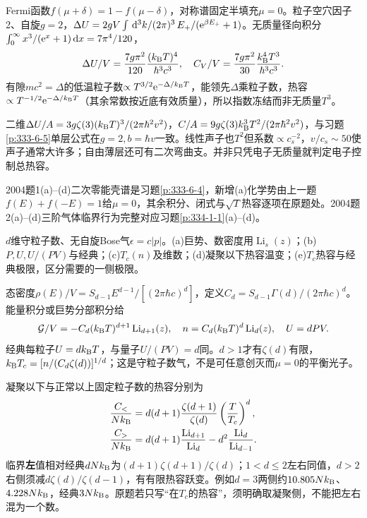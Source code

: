 \begin{solution}
Fermi函数$f(\mu+\delta)=1-f(\mu-\delta)$，对称谱固定半填充$\mu=0$。粒子空穴因子2、自旋$g=2$，$\Delta U=2gV\int\,\mathrm d^3k/(2\pi)^3\,E_+/(\mathrm e^{\beta E_+}+1)$。无质量径向积分$\int_0^\infty x^3/(\mathrm e^x+1)\,\mathrm d x=7\pi^4/120$，
\begin{equation}
\Delta U/V=\frac{7g\pi^2}{120}\frac{(k_{\mathrm B} T)^4}{\hbar^3c^3},\quad C_V/V=\frac{7g\pi^2}{30}\frac{k_{\mathrm B}^4T^3}{\hbar^3c^3}.
\end{equation}
有隙$m c^2=\Delta$的低温粒子数$\propto T^{3/2}\mathrm e^{-\Delta/k_{\mathrm B} T}$，能领先$\Delta$乘粒子数，热容$\propto T^{-1/2}\mathrm e^{-\Delta/k_{\mathrm B} T}$（其余常数按近底有效质量），所以指数冻结而非无质量$T^3$。

二维$\Delta U/A=3g\zeta(3)(k_{\mathrm B} T)^3/(2\pi\hbar^2v^2)$，$C/A=9g\zeta(3)k_{\mathrm B}^3T^2/(2\pi\hbar^2v^2)$，与习题\ref{p:333-6-5}单层公式在$g=2,b=\hbar v$一致。线性声子也$T^2$但系数$\propto c_s^{-2}$，$v/c_s\sim50$使声子通常大许多；自由薄层还可有二次弯曲支。并非只凭电子无质量就判定电子控制总热容。
\end{solution}
2004题1(a)--(d)二次零能壳谱是习题\ref{p:333-6-4}，新增(a)化学势由上一题$f(E)+f(-E)=1$给$\mu=0$，其余积分、闭式与$\sqrt T$热容逐项在原题处。2004题2(a)--(d)三阶气体临界行为完整对应习题\ref{p:334-1-1}(a)--(d)。
\begin{exercise}[2004题3(a)--(e)]\label{f:333-2004-3}
$d$维守粒子数、无自旋Bose气$\epsilon=c|p|$。(a)巨势、数密度用$\operatorname{Li}_s(z)$；(b)$P,U,U/(PV)$与经典；(c)$T_c(n)$及维数；(d)凝聚以下热容温变；(e)$T_c$热容与经典极限，区分需要的一侧极限。
\end{exercise}
\begin{solution}
态密度$\rho(E)/V=S_{d-1}E^{d-1}/[(2\pi\hbar c)^d]$，定义$C_d=S_{d-1}\Gamma(d)/(2\pi\hbar c)^d$。能量积分或巨势分部积分给
\begin{equation}
\mathcal G/V=-C_d(k_{\mathrm B} T)^{d+1}\operatorname{Li}_{d+1}(z),\quad n=C_d(k_{\mathrm B} T)^d\operatorname{Li}_d(z),\quad U=dPV.
\end{equation}
经典每粒子$U=dk_{\mathrm B} T$，与量子$U/(PV)=d$同。$d>1$才有$\zeta(d)$有限，$k_{\mathrm B} T_c=[n/(C_d\zeta(d))]^{1/d}$；这是守粒子数气，不是可任意创灭而$\mu=0$的平衡光子。

凝聚以下与正常以上固定粒子数的热容分别为
\begin{align}
\frac{C_<}{Nk_{\mathrm B}}&=d(d+1)\frac{\zeta(d+1)}{\zeta(d)}\left(\frac{T}{T_c}\right)^d,\\
\frac{C_>}{Nk_{\mathrm B}}&=d(d+1)\frac{\operatorname{Li}_{d+1}}{\operatorname{Li}_d}
-d^2\frac{\operatorname{Li}_d}{\operatorname{Li}_{d-1}}.
\end{align}
临界\textbf{左}值相对经典$dNk_{\mathrm B}$为$(d+1)\zeta(d+1)/\zeta(d)$；$1<d\le2$左右同值，$d>2$右侧须减$d\zeta(d)/\zeta(d-1)$，有有限热容跃变。例如$d=3$两侧约$10.805Nk_{\mathrm B}$、$4.228Nk_{\mathrm B}$，经典$3Nk_{\mathrm B}$。原题若只写“在$T_c$的热容”，须明确取凝聚侧，不能把左右混为一个数。
\end{solution}
